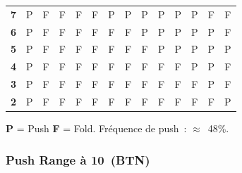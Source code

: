\documentclass[a4paper,11pt]{article}
\newcommand{\bb}{\,\mathrm{bb}}
\begin{document}
\begin{table}[H]
\begin{tabular}{c|*{13}{c}}
\textbf{7} & \cellcolor{push!15}P & \cellcolor{fold!20}F & \cellcolor{fold!20}F & \cellcolor{fold!20}F & \cellcolor{fold!20}F & \cellcolor{push!10}P & \cellcolor{push!10}P & \cellcolor{push!20}P & \cellcolor{push!10}P & \cellcolor{push!10}P & \cellcolor{push!10}P & \cellcolor{fold!20}F & \cellcolor{fold!20}F \\
\textbf{6} & \cellcolor{push!10}P & \cellcolor{fold!20}F & \cellcolor{fold!20}F & \cellcolor{fold!20}F & \cellcolor{fold!20}F & \cellcolor{fold!20}F & \cellcolor{fold!20}F & \cellcolor{push!10}P & \cellcolor{push!20}P & \cellcolor{push!10}P & \cellcolor{push!10}P & \cellcolor{push!10}P & \cellcolor{fold!20}F \\
\textbf{5} & \cellcolor{push!10}P & \cellcolor{fold!20}F & \cellcolor{fold!20}F & \cellcolor{fold!20}F & \cellcolor{fold!20}F & \cellcolor{fold!20}F & \cellcolor{fold!20}F & \cellcolor{fold!20}F & \cellcolor{push!10}P & \cellcolor{push!20}P & \cellcolor{push!10}P & \cellcolor{push!10}P & \cellcolor{push!10}P \\
\textbf{4} & \cellcolor{push!10}P & \cellcolor{fold!20}F & \cellcolor{fold!20}F & \cellcolor{fold!20}F & \cellcolor{fold!20}F & \cellcolor{fold!20}F & \cellcolor{fold!20}F & \cellcolor{fold!20}F & \cellcolor{fold!20}F & \cellcolor{fold!20}F & \cellcolor{push!20}P & \cellcolor{push!10}P & \cellcolor{fold!20}F \\
\textbf{3} & \cellcolor{push!10}P & \cellcolor{fold!20}F & \cellcolor{fold!20}F & \cellcolor{fold!20}F & \cellcolor{fold!20}F & \cellcolor{fold!20}F & \cellcolor{fold!20}F & \cellcolor{fold!20}F & \cellcolor{fold!20}F & \cellcolor{fold!20}F & \cellcolor{fold!20}F & \cellcolor{push!15}P & \cellcolor{fold!20}F \\
\textbf{2} & \cellcolor{push!10}P & \cellcolor{fold!20}F & \cellcolor{fold!20}F & \cellcolor{fold!20}F & \cellcolor{fold!20}F & \cellcolor{fold!20}F & \cellcolor{fold!20}F & \cellcolor{fold!20}F & \cellcolor{fold!20}F & \cellcolor{fold!20}F & \cellcolor{fold!20}F & \cellcolor{fold!20}F & \cellcolor{push!15}P \\
\bottomrule
\end{tabular}

\medskip
\footnotesize
\textcolor{push}{\textbf{P}} = Push \quad \textcolor{fold}{\textbf{F}} = Fold. \quad Fr\'equence de push~: $\approx$~48\%.
\end{table}

\subsubsection{Push Range \`a 10\bb{} (BTN)}
\end{document}
